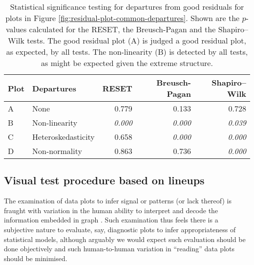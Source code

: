 \documentclass[]{interact}
\theoremstyle{plain}%
\theoremstyle{definition}
\theoremstyle{remark}
\begin{document}
\begin{table}

\caption{\label{tab:example-residual-plot-table}Statistical significance testing for departures from good residuals for plots in Figure \ref{fig:residual-plot-common-departures}. Shown are the $p$-values calculated for the RESET, the Breusch-Pagan and the Shapiro–Wilk tests. The good residual plot (A) is judged a good residual plot, as expected, by all tests. The non-linearity (B) is detected by all tests, as might be expected given the extreme structure.}
\centering
\begin{tabular}[t]{llrrr}
\toprule
Plot & Departures & RESET & Breusch-Pagan & Shapiro–Wilk\\
\midrule
A & None & 0.779 & 0.133 & 0.728\\
B & Non-linearity & \em{0.000} & \em{0.000} & \em{0.039}\\
C & Heteroskedasticity & 0.658 & \em{0.000} & \em{0.000}\\
D & Non-normality & 0.863 & 0.736 & \em{0.000}\\
\bottomrule
\end{tabular}
\end{table}

\hypertarget{visual-test-procedure-based-on-lineups}{%
\subsection{Visual test procedure based on
lineups}\label{visual-test-procedure-based-on-lineups}}

The examination of data plots to infer signal or patterns (or lack
thereof) is fraught with variation in the human ability to interpret and
decode the information embedded in graph
\citep{cleveland_graphical_1984}. Such examination thus feels there is a
subjective nature to evaluate, say, diagnostic plots to infer
appropriateness of statistical models, although arguably we would expect
such evaluation should be done objectively and such human-to-human
variation in ``reading'' data plots should be minimised.
\end{document}
